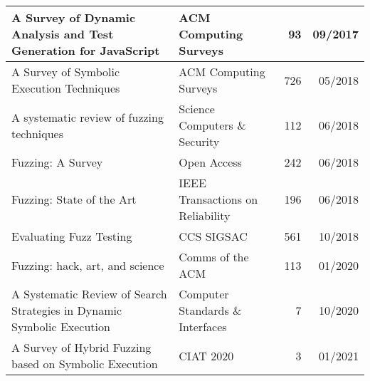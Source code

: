 \documentclass{article}
\begin{document}
\begin{longtable}{|P{0.44\textwidth}|P{0.32\textwidth}|r|r|}
  A Survey of Dynamic Analysis and Test Generation for JavaScript                                                                                    & ACM Computing Surveys                                      & 93             & 09/2017       \\\hline
  A Survey of Symbolic Execution Techniques\cite{SurveySymbex}                                                                                       & ACM Computing Surveys                                      & 726            & 05/2018       \\\hline
  A systematic review of fuzzing techniques\cite{Science}                                                                                            & Science Computers \& Security                              & 112            & 06/2018       \\\hline
  Fuzzing: A Survey\cite{FuzzingASurvey}                                                                                                             & Open Access                                                & 242            & 06/2018       \\\hline
  Fuzzing: State of the Art\cite{FuzzingStateOfTheArt2018}                                                                                           & IEEE Transactions on Reliability                           & 196            & 06/2018       \\\hline
  Evaluating Fuzz Testing\cite{EvaluatingFuzzTesting}                                                                                                & CCS SIGSAC                                                 & 561            & 10/2018       \\\hline
  Fuzzing: hack, art, and science\cite{HackArtScience}                                                                                               & Comms of the ACM                                           & 113            & 01/2020       \\\hline
  A Systematic Review of Search Strategies in Dynamic Symbolic Execution\cite{SearchStrategies}                                                      & Computer Standards \& Interfaces                           & 7              & 10/2020       \\\hline
  A Survey of Hybrid Fuzzing based on Symbolic Execution\cite{SurveyHybrid}                                                                          & CIAT 2020                                                  & 3              & 01/2021       \\\hline

\end{longtable}
\end{document}
